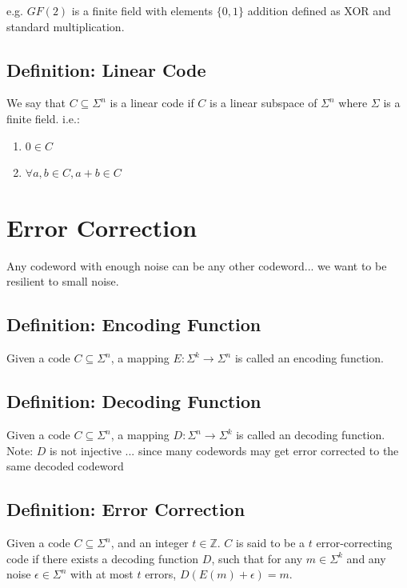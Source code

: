 \documentclass[12pt]{article}
\begin{document}
e.g. $GF(2)$ is a finite field with elements $ \{0, 1\}$ addition defined as XOR and standard multiplication.

\subsection{Definition: Linear Code}
We say that $C \subseteq \Sigma^n$ is a linear code if $C$  is a linear subspace of $\Sigma^n$ where $\Sigma$ is a finite field. i.e.:

\begin{enumerate}
  \item $0 \in C$
  \item $\forall a,b \in C, a+b \in C$ 
\end{enumerate}

\break

\section{Error Correction}

Any codeword with enough noise can be any other codeword... we want to be resilient to small noise. 

\subsection{Definition: Encoding Function}
Given a code $C \subseteq \Sigma^n$, a mapping $E: \Sigma^k \rightarrow \Sigma^n$ is called an encoding function.


\subsection{Definition: Decoding Function}
Given a code $C \subseteq \Sigma^n$, a mapping $D: \Sigma^n \rightarrow \Sigma^k$ is called an decoding function.\\ 
Note: $D$ is not injective ... since many codewords may get error corrected to the same decoded codeword 

\subsection{Definition: Error Correction}
Given a code $C \subseteq \Sigma^n$, and an integer $t \in \mathbb{Z}$. $C$ is said to be a $t$ error-correcting code if there exists a decoding function $D$, such that for any $m \in \Sigma^k$ and any noise $\epsilon \in \Sigma^n$ with at most $t$ errors, $D(E(m) + \epsilon) = m$.
\end{document}
